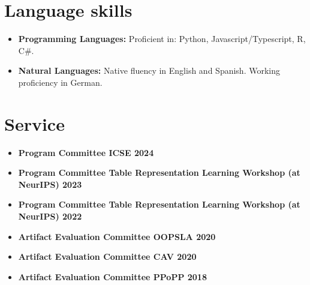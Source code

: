 \documentclass[11pt,a4paper,sans]{moderncv}
\begin{document}
\section{Language skills}

\vspace{6pt}

\begin{itemize}

\item \textbf{Programming Languages:} Proficient in: Python, Javascript/Typescript, R, C\#.

\vspace{6pt}

\item \textbf{Natural Languages:} Native fluency in English and Spanish. Working proficiency in German.
\vspace{6pt}

\end{itemize}

\section{Service}
\begin{itemize}
  \item \textbf{Program Committee ICSE 2024}
  \item \textbf{Program Committee Table Representation Learning Workshop (at NeurIPS) 2023}
  \item \textbf{Program Committee Table Representation Learning Workshop (at NeurIPS) 2022}
  \item \textbf{Artifact Evaluation Committee OOPSLA 2020}
  \item \textbf{Artifact Evaluation Committee CAV 2020}
  \item \textbf{Artifact Evaluation Committee PPoPP 2018}


\end{itemize}
\end{document}
